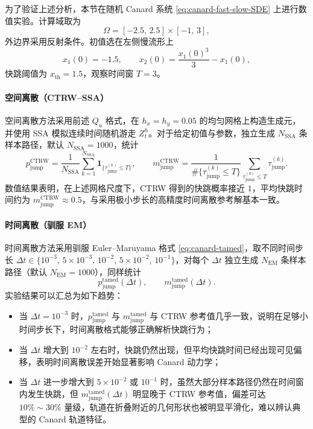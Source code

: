 为了验证上述分析，本节在随机 Canard 系统 \eqref{eq:canard-fast-slow-SDE} 上进行数值实验。计算域取为
\[
\Omega=[-2.5,\,2.5]\times[-1,\,3],
\]
外边界采用反射条件。初值选在左侧慢流形上
\[
x_1(0) = -1.5,\qquad
x_2(0) = \frac{x_1(0)^3}{3}-x_1(0),
\]
快跳阈值为 \(x_{\mathrm{th}}=1.5\)，观察时间窗 \(T=3\)。

\paragraph{空间离散（CTRW--SSA）}

空间离散方法采用前述 \(Q_u\) 格式，在 \(h_x=h_y=0.05\) 的均匀网格上构造生成元，并使用 SSA 模拟连续时间随机游走 \(Z_t^h\)。对于给定初值与参数，独立生成 \(N_{\mathrm{SSA}}\) 条样本路径，默认 \(N_{\mathrm{SSA}}=1000\)，统计
\[
p_{\mathrm{jump}}^{\mathrm{CTRW}}
= \frac{1}{N_{\mathrm{SSA}}}\sum_{k=1}^{N_{\mathrm{SSA}}}
\mathbf{1}_{\{\tau_{\mathrm{jump}}^{(k)}\le T\}},\qquad
m_{\mathrm{jump}}^{\mathrm{CTRW}}
= \frac{1}{\#\{\tau_{\mathrm{jump}}^{(k)}\le T\}}
\sum_{\tau_{\mathrm{jump}}^{(k)}\le T}\tau_{\mathrm{jump}}^{(k)}.
\]
数值结果表明，在上述网格尺度下，CTRW 得到的快跳概率接近 \(1\)，平均快跳时间约为 \(m_{\mathrm{jump}}^{\mathrm{CTRW}}\approx0.5\)，与采用极小步长的高精度时间离散参考解基本一致。

\paragraph{时间离散（驯服 EM）}

时间离散方法采用驯服 Euler--Maruyama 格式 \eqref{eq:canard-tamed}，取不同时间步长 \(\Delta t\in\{10^{-3},\,5\times10^{-3},\,10^{-2},\,5\times10^{-2},\,10^{-1}\}\)，对每个 \(\Delta t\) 独立生成 \(N_{\mathrm{EM}}\) 条样本路径（默认 \(N_{\mathrm{EM}}=1000\)），同样统计
\[
p_{\mathrm{jump}}^{\mathrm{tamed}}(\Delta t),\qquad
m_{\mathrm{jump}}^{\mathrm{tamed}}(\Delta t).
\]
实验结果可以汇总为如下趋势：
\begin{itemize}
	\item 当 \(\Delta t=10^{-3}\) 时，\(p_{\mathrm{jump}}^{\mathrm{tamed}}\) 与 \(m_{\mathrm{jump}}^{\mathrm{tamed}}\) 与 CTRW 参考值几乎一致，说明在足够小时间步长下，时间离散格式能够正确解析快跳行为；
	\item 当 \(\Delta t\) 增大到 \(10^{-2}\) 左右时，快跳仍然出现，但平均快跳时间已经出现可见偏移，表明时间离散误差开始显著影响 Canard 动力学；
	\item 当 \(\Delta t\) 进一步增大到 \(5\times10^{-2}\) 或 \(10^{-1}\) 时，虽然大部分样本路径仍然在时间窗内发生快跳，但 \(m_{\mathrm{jump}}^{\mathrm{tamed}}(\Delta t)\) 明显晚于 CTRW 参考值，偏差可达 \(10\%\sim30\%\) 量级，轨道在折叠附近的几何形状也被明显平滑化，难以辨认典型的 Canard 轨道特征。
\end{itemize}

